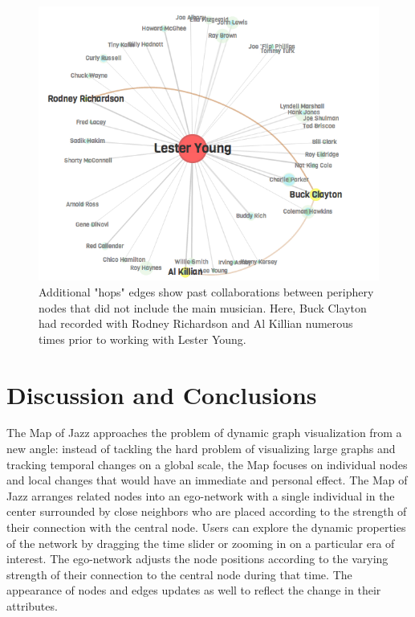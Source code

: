 \documentclass[12pt]{cmuthesis}
\begin{document}
  \begin{figure}[ht]
    \includegraphics[width=\linewidth]{lester-young}
    \caption{Additional "hops" edges show past collaborations between periphery
  nodes that did not include the main musician. Here, Buck Clayton had recorded
  with Rodney Richardson and Al Killian numerous times prior to
  working with Lester Young.}
    \label{fig:young}
  \end{figure}

\section{Discussion and Conclusions}

  The Map of Jazz approaches the problem of dynamic graph visualization from a new
  angle: instead of tackling the hard problem of visualizing large graphs and
  tracking temporal changes on a global scale, the Map focuses on individual
  nodes and local changes that would have an immediate and personal effect. The Map
  of Jazz arranges related nodes into an ego-network with a single individual in
  the center surrounded by close neighbors who are placed according to the
  strength of their connection with the central node. Users can explore the
  dynamic properties of the network by dragging the time slider or zooming in on
  a particular era of interest. The ego-network adjusts the node positions
  according to the varying strength of their connection to the central node
  during that time. The appearance of nodes and edges updates as well to reflect
  the change in their attributes.
\end{document}
